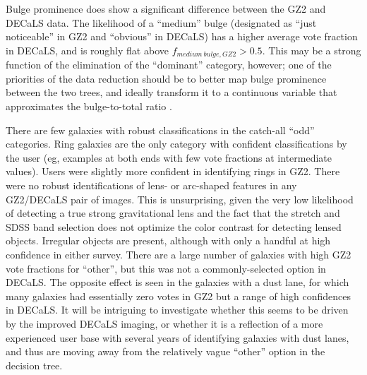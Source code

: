 \documentclass[iop,apj,tighten]{emulateapj}
\begin{document}
Bulge prominence does show a significant difference between the GZ2 and DECaLS data. The likelihood of a ``medium'' bulge (designated as ``just noticeable'' in GZ2 and ``obvious'' in DECaLS) has a higher average vote fraction in DECaLS, and is roughly flat above $f_{medium~bulge,GZ2}>0.5$. This may be a strong function of the elimination of the ``dominant'' category, however; one of the priorities of the data reduction should be to better map bulge prominence between the two trees, and ideally transform it to a continuous variable that approximates the bulge-to-total ratio \citep[eg,][]{lac12}. 

There are few galaxies with robust classifications in the catch-all ``odd'' categories. Ring galaxies are the only category with confident classifications by the user (eg, examples at both ends with few vote fractions at intermediate values). Users were slightly more confident in identifying rings in GZ2. There were no robust identifications of lens- or arc-shaped features in any GZ2/DECaLS pair of images. This is unsurprising, given the very low likelihood of detecting a true strong gravitational lens \citep[$\sim2\times10^{-4}$;][]{mar16} and the fact that the stretch and SDSS band selection does not optimize the color contrast for detecting lensed objects. Irregular objects are present, although with only a handful at high confidence in either survey. There are a large number of galaxies with high GZ2 vote fractions for ``other'', but this was not a commonly-selected option in DECaLS. The opposite effect is seen in the galaxies with a dust lane, for which many galaxies had essentially zero votes in GZ2 but a range of high confidences in DECaLS. It will be intriguing to investigate whether this seems to be driven by the improved DECaLS imaging, or whether it is a reflection of a more experienced user base with several years of identifying galaxies with dust lanes, and thus are moving away from the relatively vague ``other'' option in the decision tree.

\acknowledgments{
}



\end{document}

